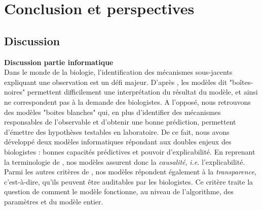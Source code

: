 \documentclass[../main.tex]{subfiles}
\begin{document}
\chapter{Conclusion et perspectives }
\label{perspective}

\section*{Discussion}

\textbf{Discussion partie informatique}\\
Dans le monde de la biologie, l'identification des mécanismes sous-jacents expliquant une observation est un défi majeur. D'après \citep{lipton2017mythos}, les modèles dit "boîtes-noires" permettent difficilement une interprétation du résultat du modèle, et ainsi ne correspondent pas à la demande des biologistes. A l'opposé, nous retrouvons des modèles "boites blanches" qui, en plus d'identifier des mécanismes responsables de l'observable et d'obtenir une bonne prédiction, permettent d'émettre des hypothèses testables en laboratoire. De ce fait, nous avons développé deux modèles informatiques répondant aux doubles enjeux des biologistes : bonnes capacités prédictives et pouvoir d'explicabilité. En reprenant la terminologie de \citep{lipton2017mythos}, nos modèles assurent donc la \textit{causalité}, \textit{i.e.} l'explicabilité. Parmi les autres critères de \citep{lipton2017mythos}, nos modèles répondent également à la \textit{transparence}, c'est-à-dire, qu'ils peuvent être auditables par les biologistes. Ce critère traite la question de comment le modèle fonctionne, au niveau de l'algorithme, des paramètres  et du modèle entier. \label{contraintes-model}\\
\end{document}
